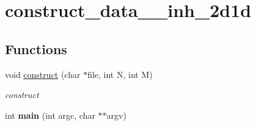 \hypertarget{group__applications__mri2d__construct__data__inh__2d1d}{
\section{construct\_\-data\_\-\_\-inh\_\-2d1d}
\label{group__applications__mri2d__construct__data__inh__2d1d}
}
\subsection*{Functions}
\begin{CompactItemize}
\item 
\hypertarget{group__applications__mri2d__construct__data__inh__2d1d_ga0}{
void \hyperlink{group__applications__mri2d__construct__data__inh__2d1d_ga0}{construct} (char $\ast$file, int N, int M)}
\label{group__applications__mri2d__construct__data__inh__2d1d_ga0}

\begin{CompactList}\small\item\em construct \item\end{CompactList}\item 
\hypertarget{group__applications__mri2d__construct__data__inh__2d1d_ga1}{
int {\bf main} (int argc, char $\ast$$\ast$argv)}
\label{group__applications__mri2d__construct__data__inh__2d1d_ga1}

\end{CompactItemize}
